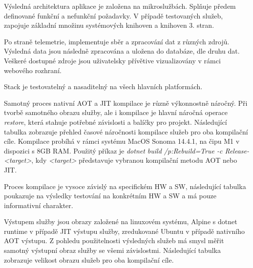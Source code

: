 


Výsledná architektura aplikace je založena na mikroslužbách. Splňuje předem definované funkční a nefunkční požadavky. V případě testovaných služeb, zapojuje základní množinu systémových knihoven a knihoven 3. stran.

Po straně telemetrie, implementuje sběr a zpracování dat z různých zdrojů. Výsledná data jsou následně zpracována a uložena do databáze, dle druhu dat. Veškeré dostupné zdroje jsou uživatelsky přívětive vizualizovány v rámci webového rozhraní.

Stack je testovatelný a nasaditelný na všech hlavních platformách.



Samotný proces nativní AOT a JIT kompilace je různě výkonnostně náročný. Při tvorbě samotného obrazu služby, ale i kompilace je hlavní náročná operace \emph{restore}, která stahuje potřebné závislosti a balíčky pro projekt. Následující tabulka zobrazuje přehled časové náročnosti kompilace služeb pro oba kompilační cíle. Kompilace probíhá v rámci systému MacOS Sonoma 14.4.1, na čipu M1 v dispozici s 8GB RAM. Použitý příkaz je \emph{dotnet build /p:Rebuild=True -c Release-<target>}, kdy \emph{<target>} představuje vybranou kompilační metodu AOT nebo JIT.

Proces kompilace je vysoce závislý na specifickém HW a SW, následující tabulka poukazuje na výsledky testování na konkrétním HW a SW a má pouze informativní charakter.


Výstupem služby jsou obrazy založené na linuxovém systému, Alpine s dotnet runtime v případě JIT výstupu služby, zredukované Ubuntu v případě nativního AOT výstupu. Z pohledu použitelnosti výsledných služeb má smysl měřit samotný výstupní obraz služby se všemi závislostmi. Následující tabulka zobrazuje velikost obrazu služeb pro oba kompilační cíle.

